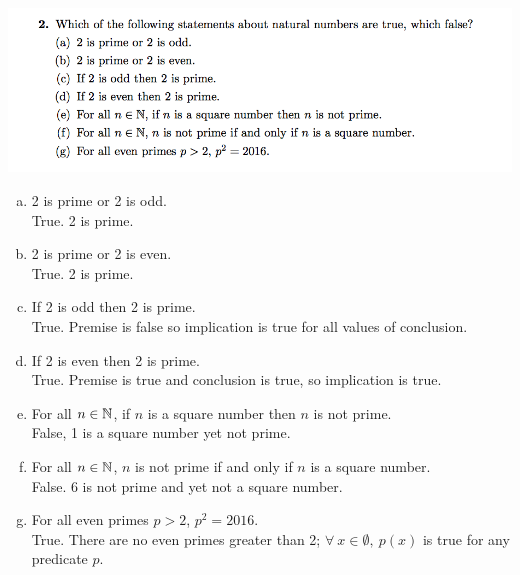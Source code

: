 \documentclass[12pt]{article}
\begin{document}
\subsection*{}
\includegraphics[width=450pt]{img/iulm-2-2.png}
\begin{mdframed}
  \begin{enumerate}[(a)]
  \item 2 is prime or 2 is odd.\\
    True. 2 is prime.
  \item 2 is prime or 2 is even.\\
    True. 2 is prime.
  \item If 2 is odd then 2 is prime.\\
    True. Premise is false so implication is true for all values of conclusion.
  \item If 2 is even then 2 is prime.\\
    True. Premise is true and conclusion is true, so implication is true.
  \item For all $n \in \mathbb{N}$, if $n$ is a square number then $n$ is not prime.\\
    False, 1 is a square number yet not prime.
  \item For all $n \in \mathbb{N}$, $n$ is not prime if and only if $n$ is a square number.\\
    False. 6 is not prime and yet not a square number.
  \item For all even primes $p > 2$, $p^2 = 2016$.\\
    True. There are no even primes greater than 2;
    $\forall ~ x \in \emptyset, ~p(x)$ is true for any predicate $p$.
  \end{enumerate}
\end{mdframed}
\end{document}
